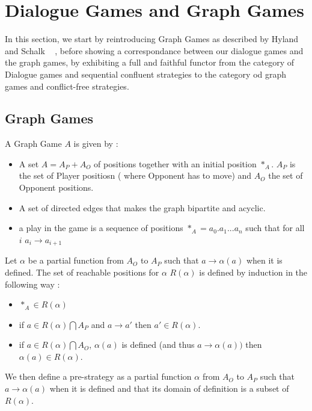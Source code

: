 \documentclass[a4paper,UKenglish]{lipics}
\begin{document}
\section{Dialogue Games and Graph Games}
In this section, we start by reintroducing Graph Games as described by Hyland and Schalk ~\cite{} , before showing a correspondance between our dialogue games and the graph games, by exhibiting a full and faithful functor from the category of Dialogue games and sequential confluent strategies to the category od graph games and conflict-free strategies.\\


\subsection{Graph Games}
\begin{definition}
A Graph Game $A$ is given by :
\begin{itemize}
\item A set $A = A_P + A_O$ of positions together with an initial position $*_A$. $A_P$ is the set of Player positiosn ( where Opponent has to move) and $A_O$ the set of Opponent positions.
\item A set of directed edges that makes the graph bipartite and  acyclic.
\item a play in the game is a sequence of positions $*_A=a_0.a_1...a_n$ such that for all $i$ $a_i \rightarrow a_{i+1}$
\end{itemize}
\end{definition}

\begin{definition}
Let $\alpha$ be a partial function from $A_O$ to $A_P$ such that $a\rightarrow \alpha(a)$ when it is defined. The set of reachable positions for $\alpha$ $R(\alpha)$ is defined by induction in the following way : 
\begin{itemize}
\item $*_A \in R(\alpha)$
\item if $a \in R(\alpha)\bigcap A_P$ and $a\rightarrow a'$ then $a'\in R(\alpha)$. 
\item if $a \in R(\alpha)\bigcap A_O$, $\alpha(a)$ is defined (and thus $a\rightarrow \alpha(a)) $ then $\alpha(a)\in R(\alpha)$.
\end{itemize}
 
We then define a pre-strategy as a partial function $\alpha$ from $A_O$ to $A_P$ such that $a\rightarrow \alpha(a)$ when it is defined and that its domain of definition is a subset of $R(\alpha)$.
\end{definition}
\end{document}
